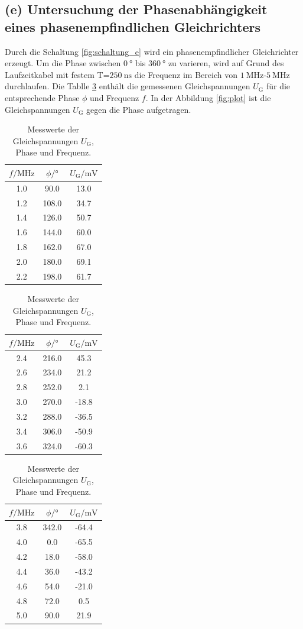 \FloatBarrier
\subsection{(e) Untersuchung der Phasenabhängigkeit eines
phasenempfindlichen Gleichrichters}
\label{subsec:auswertung_e}
Durch die Schaltung \ref{fig:schaltung_e} wird ein phasenempfindlicher
Gleichrichter erzeugt. Um die Phase \phi zwischen
$\SI{0}{\degree}$ bis $\SI{360}{\degree}$ zu varieren, wird
auf Grund des Laufzeitkabel mit festem T=$\SI{250}{\nano\second}$
die Frequenz im Bereich von $\SI{1}{\mega\hertz}$-$\SI{5}{\mega\hertz}$
durchlaufen. Die Tablle \ref{tab:messwerte} enthält die gemessenen
Gleichspannungen $U_{\text{G}}$ für die entsprechende Phase $\phi$ und Frequenz $f$.
In der Abbildung \ref{fig:plot} ist die Gleichspannungen $U_{\text{G}}$
gegen die Phase aufgetragen.
\begin{table}
  \centering
  \caption{Messwerte der Gleichspannungen $U_{\text{G}}$, Phase \phi und Frequenz.}
  \label{tab:messwerte}
\begin{tabular}{c c c|}
\toprule
$f/\si{\mega\hertz}$ & $\phi / \si{\degree}$ &$ U_{\text{G}}/ \si{\milli\volt}$ \\
  \midrule
   1.0	&	90.0	&	13.0   \\
   1.2	&	108.0	&	34.7   \\
   1.4	&	126.0	&	50.7   \\
   1.6	&	144.0	&	60.0   \\
   1.8	&	162.0	&	67.0   \\
   2.0	&	180.0	&	69.1   \\
   2.2	&	198.0	&	61.7   \\
\bottomrule
\end{tabular}
\begin{tabular}{|c c c|}
  \toprule
  $f/\si{\mega\hertz}$ & $\phi / \si{\degree}$ &$ U_{\text{G}}/ \si{\milli\volt}$ \\
    \midrule
   2.4	&	216.0	&	45.3   \\
   2.6	&	234.0	&	21.2   \\
   2.8	&	252.0	&	2.1   \\
   3.0	&	270.0	&	-18.8   \\
   3.2	&	288.0	&	-36.5   \\
   3.4	&	306.0	&	-50.9   \\
   3.6	&	324.0	&	-60.3   \\
   \bottomrule
   \end{tabular}
  \begin{tabular}{|c c c}
    \toprule
    $f/\si{\mega\hertz}$ & $\phi / \si{\degree}$& $ U_{\text{G}}/ \si{\milli\volt}$ \\
      \midrule
   3.8	&	342.0	&	-64.4   \\
   4.0	&	0.0	&	-65.5   \\
   4.2	&	18.0	&	-58.0   \\
   4.4	&	36.0	&	-43.2   \\
   4.6	&	54.0	&	-21.0   \\
   4.8	&	72.0	&	0.5   \\
   5.0	&	90.0	&	21.9   \\
\bottomrule
\end{tabular}
\end{table}


